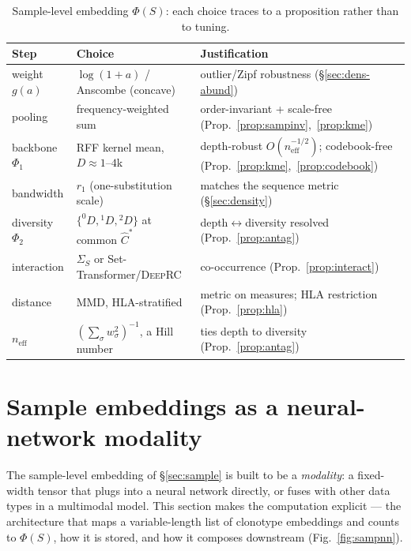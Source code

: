 \documentclass[11pt]{article}
\theoremstyle{oldplain}
\theoremstyle{oldrem}
\begin{document}
\begin{table}[h]
  \centering
  \caption{Sample-level embedding $\Phi(S)$: each choice traces to a proposition rather than to tuning.}
  \label{tab:sample}
  {\small
  \begin{tabular}{lll}
    \toprule
    Step & Choice & Justification \\
    \midrule
    weight $g(a)$ & $\log(1{+}a)$ / Anscombe (concave) & outlier/Zipf robustness (\S\ref{sec:dens-abund}) \\
    pooling & frequency-weighted sum & order-invariant + scale-free (Prop.~\ref{prop:sampinv},~\ref{prop:kme}) \\
    backbone $\Phi_1$ & {\scshape RFF} kernel mean, $D\!\approx\!1$--$4$k & depth-robust $O(n_{\mathrm{eff}}^{-1/2})$; codebook-free (Prop.~\ref{prop:kme},~\ref{prop:codebook}) \\
    bandwidth & $r_1$ (one-substitution scale) & matches the sequence metric (\S\ref{sec:density}) \\
    diversity $\Phi_2$ & $\{^0D,{}^1D,{}^2D\}$ at common $\hat C^\ast$ & depth$\leftrightarrow$diversity resolved (Prop.~\ref{prop:antag}) \\
    interaction & $\Sigma_S$ or Set-Transformer/{\scshape DeepRC} & co-occurrence (Prop.~\ref{prop:interact}) \\
    distance & {\scshape MMD}, {\scshape HLA}-stratified & metric on measures; {\scshape HLA} restriction (Prop.~\ref{prop:hla}) \\
    $n_{\mathrm{eff}}$ & $(\sum_\sigma w_\sigma^2)^{-1}$, a Hill number & ties depth to diversity (Prop.~\ref{prop:antag}) \\
    \bottomrule
  \end{tabular}}
\end{table}

\section{Sample embeddings as a neural-network modality}\label{sec:samp-nn}

The sample-level embedding of \S\ref{sec:sample} is built to be a \emph{modality}: a fixed-width tensor that
plugs into a neural network directly, or fuses with other data types in a multimodal model. This section makes
the computation explicit --- the architecture that maps a variable-length list of clonotype embeddings and
counts to $\Phi(S)$, how it is stored, and how it composes downstream (Fig.~\ref{fig:sampnn}).
\end{document}
